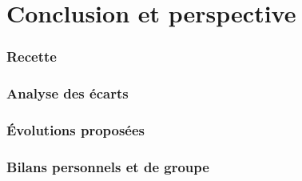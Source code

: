 \part{Conclusion et perspective}
\section{Recette}
\section{Analyse des écarts}
\section{Évolutions proposées}
\section{Bilans personnels et de groupe}
